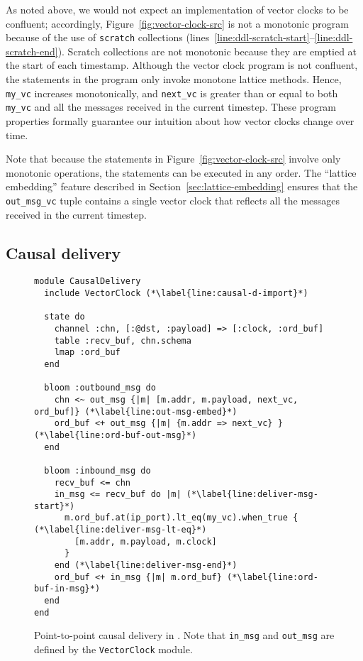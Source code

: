 As noted above, we would not expect an implementation of vector clocks to be
confluent; accordingly, Figure~\ref{fig:vector-clock-src} is not a monotonic
\lang program because of the use of \texttt{scratch} collections
(lines~\ref{line:ddl-scratch-start}--\ref{line:ddl-scratch-end}). Scratch
collections are not monotonic because they are emptied at the start of each
timestamp. Although the vector clock program is not confluent, the statements in
the program only invoke monotone lattice methods. Hence, \texttt{my\_vc}
increases monotonically, and \texttt{next\_vc} is greater than or equal to both
\texttt{my\_vc} and all the messages received in the current timestep. These program properties formally guarantee our intuition about how vector clocks change over time.

Note that because the statements in Figure~\ref{fig:vector-clock-src} involve
only monotonic operations, the statements can be executed in any order. The
``lattice embedding'' feature described in Section~\ref{sec:lattice-embedding}
ensures that the \texttt{out\_msg\_vc} tuple contains a single vector clock that
reflects all the messages received in the current timestep.


\subsection{Causal delivery}
\begin{figure}[t]
\begin{scriptsize}
\begin{lstlisting}
module CausalDelivery
  include VectorClock (*\label{line:causal-d-import}*)

  state do
    channel :chn, [:@dst, :payload] => [:clock, :ord_buf]
    table :recv_buf, chn.schema
    lmap :ord_buf
  end

  bloom :outbound_msg do
    chn <~ out_msg {|m| [m.addr, m.payload, next_vc, ord_buf]} (*\label{line:out-msg-embed}*)
    ord_buf <+ out_msg {|m| {m.addr => next_vc} } (*\label{line:ord-buf-out-msg}*)
  end

  bloom :inbound_msg do
    recv_buf <= chn
    in_msg <= recv_buf do |m| (*\label{line:deliver-msg-start}*)
      m.ord_buf.at(ip_port).lt_eq(my_vc).when_true { (*\label{line:deliver-msg-lt-eq}*)
        [m.addr, m.payload, m.clock]
      }
    end (*\label{line:deliver-msg-end}*)
    ord_buf <+ in_msg {|m| m.ord_buf} (*\label{line:ord-buf-in-msg}*)
  end
end
\end{lstlisting}
\end{scriptsize}
\caption{Point-to-point causal delivery in \lang. Note that \texttt{in\_msg} and
\texttt{out\_msg} are defined by the \texttt{VectorClock} module.}
\label{fig:causal-delivery-src}
\end{figure}

